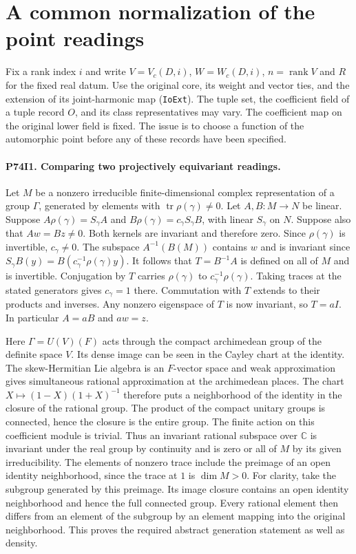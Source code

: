 \section{A common normalization of the point readings}

Fix a rank index $i$ and write $V=V_c(D,i)$, $W=W_c(D,i)$,
$n=\operatorname{rank} V$ and $R$ for the fixed real datum. Use the
original core, its weight and vector ties, and the extension of its
joint-harmonic map (\texttt{IoExt}). The tuple set, the coefficient
field of a tuple record $O$, and its class representatives may vary.
The coefficient map on the original lower field is fixed. The issue
is to choose a function of the automorphic point before any of these
records have been specified.

\paragraph{P74I1. Comparing two projectively equivariant readings.}
Let $M$ be a nonzero irreducible finite-dimensional complex
representation of a group $\Gamma$, generated by elements with
$\operatorname{tr}\rho(\gamma)\ne0$. Let $A,B:M\to N$ be linear.
Suppose $A\rho(\gamma)=S_\gamma A$ and
$B\rho(\gamma)=c_\gamma S_\gamma B$, with linear $S_\gamma$
on $N$. Suppose also that $Aw=Bz\ne0$. Both kernels are invariant
and therefore zero. Since $\rho(\gamma)$ is invertible,
$c_\gamma\ne0$. The subspace $A^{-1}(B(M))$ contains $w$ and
is invariant since $S_\gamma B(y)=B(c_\gamma^{-1}\rho(\gamma)y)$.
It follows that $T=B^{-1}A$ is defined on all of $M$ and is invertible.
Conjugation by $T$ carries $\rho(\gamma)$ to
$c_\gamma^{-1}\rho(\gamma)$. Taking traces at the stated
generators gives $c_\gamma=1$ there. Commutation with $T$ extends
to their products and inverses. Any nonzero eigenspace of $T$ is now
invariant, so $T=aI$. In particular $A=aB$ and $aw=z$.

Here $\Gamma=U(V)(F)$ acts through the compact archimedean group of
the definite space $V$. Its dense image can be seen in the Cayley
chart at the identity. The skew-Hermitian Lie algebra is an $F$-vector
space and weak approximation gives simultaneous rational
approximation at the archimedean places. The chart
$X\mapsto(1-X)(1+X)^{-1}$ therefore puts a neighborhood of the
identity in the closure of the rational group. The product of the
compact unitary groups is connected, hence the closure is the entire
group. The finite action on this coefficient module is trivial. Thus
an invariant rational subspace over $\mathbb C$ is invariant under
the real group by continuity and is zero or all of $M$ by its given
irreducibility. The elements of nonzero trace include the preimage
of an open identity neighborhood, since the trace at $1$ is
$\dim M>0$. For clarity, take the subgroup generated by this
preimage. Its image closure contains an open identity neighborhood
and hence the full connected group. Every rational element then
differs from an element of the subgroup by an element mapping into
the original neighborhood. This proves the required abstract
generation statement as well as density.

